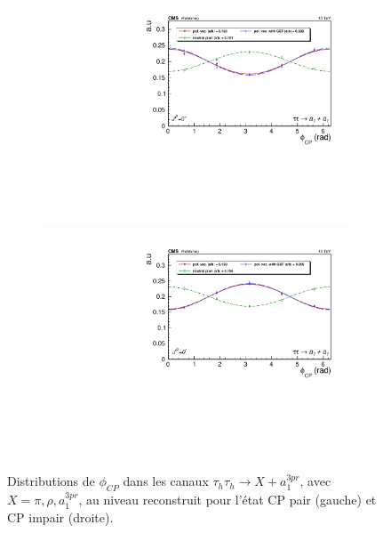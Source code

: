 \begin{figure}[]
    \begin{subfigure}[b]{0.5\linewidth}
    \centering
    \includegraphics[width=\linewidth]{Chapitre6/Images/A1A1/A1A1_even_reco.pdf} 
    \caption*{} 
    \vspace{0.5ex}
  \end{subfigure}%
  \begin{subfigure}[b]{0.5\linewidth}
    \centering
    \includegraphics[width=\linewidth]{Chapitre6/Images/A1A1/A1A1_odd_reco.pdf} 
    \caption*{} 
    \vspace{0.5ex}
  \end{subfigure} 
  
  \caption{Distributions de $\phi_{CP}$ dans les canaux $\tau_h\tau_h\rightarrow X+a_1^{3pr}$, avec $X=\pi,\rho,a^{3pr}_1$, au niveau reconstruit pour l'état CP pair (gauche) et CP impair (droite).}
  \label{CPreco}
\end{figure}

